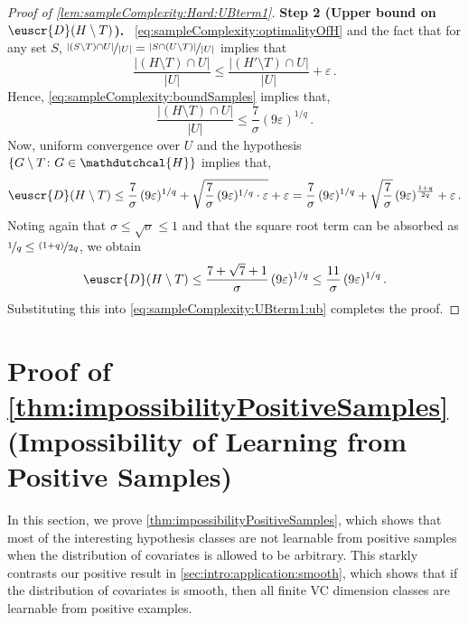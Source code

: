 \documentclass[11pt]{article}
\theoremstyle{plain}
\theoremstyle{definition}
\theoremstyle{remark}
\def\abs#1{\left| #1 \right|}
\newcommand{\inbrace}[1]{\left\{#1\right\}}
\newcommand{\nfrac}[2]{\nicefrac{#1}{#2}}
\newcommand{\eps}{\varepsilon}
\newcommand{\customcal}[1]{\euscr{#1}}
\newcommand{\cD}{\customcal{D}}
\renewcommand{\paragraph}[1]{\medskip \noindent\textbf{#1}~}
\newcommand{\hypo}[1]{\mathdutchcal{#1}}
\newcommand{\hyH}{\hypo{H}}
\begin{document}
\begin{proof}[Proof of \cref{lem:sampleComplexity:Hard:UBterm1}]
                \paragraph{Step 2 (Upper bound on $\cD(H\setminus T)$).}
                    \cref{eq:sampleComplexity:optimalityOfH} and the fact that for any set $S$, $\nfrac{\abs{(S\setminus T)\cap U}}{\abs{U}}=\nfrac{\abs{S\cap (U\setminus T)}}{\abs{U}}$ implies that 
                    \[
                        \frac{\abs{(H\setminus T)\cap U}}{\abs{U}}
                        \leq 
                        \frac{\abs{(H'\setminus T)\cap U}}{\abs{U}}
                        +\eps\,.
                    \]
                    Hence, \cref{eq:sampleComplexity:boundSamples} implies that,
                    \[
                        \frac{\abs{(H\setminus T)\cap U}}{\abs{U}}
                        \leq  \frac{7}{\sigma}(9\eps )^{1/q}\,.
                    \]
                    Now, uniform convergence over $U$ and the hypothesis $\inbrace{G\setminus T\colon G\in \hyH}$ implies that,
                    \begin{align*}
                        \cD(H\setminus T)
                        \leq 
                            \frac{7}{\sigma}\,(9\eps )^{1/q}
                            + \sqrt{\frac{7}{\sigma}\,(9\eps )^{1/q} \cdot \eps}
                            + \eps
                            = 
                                \frac{7}{\sigma}\,(9\eps )^{1/q}
                                +
                                \sqrt{\frac{7}{\sigma}}\,(9\eps )^{\frac{1+q}{2q}}
                                +\eps \,.
                    \end{align*}
                    Noting again that $\sigma\leq \sqrt{\sigma}\leq 1$ and that the square root term can be absorbed as $\nfrac{1}{q}\leq \nfrac{(1+q)}{2q}$, we obtain
                    \[
                            \cD(H\setminus T)
                            \leq \frac{7+\sqrt{7}+1}{\sigma}\, (9\eps )^{1/q}
                            \leq \frac{11}{\sigma} \, (9\eps )^{1/q}
                            \,.
                    \]
                    Substituting this into \cref{eq:sampleComplexity:UBterm1:ub} completes the proof.
            \end{proof}


\section{Proof of \cref{thm:impossibilityPositiveSamples} (Impossibility of Learning from Positive Samples)}\label{sec:asmp:examples}  
    \label{sec:lowerBound:positiveSamples}
    In this section, we prove \cref{thm:impossibilityPositiveSamples}, which shows that most of the interesting hypothesis classes are not learnable from positive samples when the distribution of covariates is allowed to be arbitrary.
    This starkly contrasts our positive result in \cref{sec:intro:application:smooth}, which shows that if the distribution of covariates is smooth, then all finite VC dimension classes are learnable from positive examples.
\end{document}
